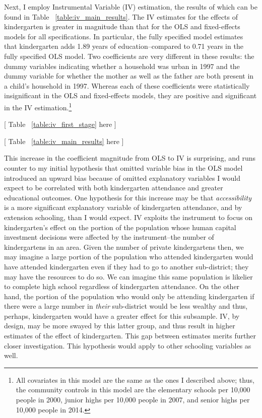 Next, I employ Instrumental Variable (IV) estimation, the results of which can be found in Table ~\ref{table:iv_main_results}. The IV estimates for the effects of kindergarten is greater in magnitude than that for the OLS and fixed-effects models for all specifications. In particular, the fully specified model estimates that kindergarten adds 1.89 years of education--compared to 0.71 years in the fully specified OLS model. Two coefficients are very different in these results: the dummy variables indicating whether a household was urban in 1997 and the dummy variable for whether the mother as well as the father are both present in a child’s household in 1997. Whereas each of these coefficients were statistically insignificant in the OLS and fixed-effects models, they are positive and significant in the IV estimation.\footnote{All covariates in this model are the same as the ones I described above; thus, the community controls in this model are the elementary schools per 10,000 people in 2000, junior highs per 10,000 people in 2007, and senior highs per 10,000 people in 2014.} 
\begin{center}
	[ Table ~\ref{table:iv_first_stage} here ]
	
	[ Table ~\ref{table:iv_main_results} here ]
\end{center}
This increase in the coefficient magnitude from OLS to IV is surprising, and runs counter to my initial hypothesis that omitted variable bias in the OLS model introduced an upward bias because of omitted explanatory variables I would expect to be correlated with both kindergarten attendance and greater educational outcomes. One hypothesis for this increase may be that \textit{accessibility} is a more significant explanatory variable of kindergarten attendance, and by extension schooling, than I would expect. IV exploits the instrument to focus on kindergarten's effect on the portion of the population whose human capital investment decisions were affected by the instrument--the number of kindergartens in an area. Given the number of private kindergartens then, we may imagine a large portion of the population who attended kindergarten would have attended kindergarten even if they had to go to another sub-district; they may have the resources to do so. We can imagine this same population is likelier to complete high school regardless of kindergarten attendance. On the other hand, the portion of the population who would only be attending kindergarten if there were a large number in \textit{their} sub-district would be less wealthy and thus, perhaps, kindergarten would have a greater effect for this subsample. IV, by design, may be more swayed by this latter group, and thus result in higher estimates of the effect of kindergarten. This gap between estimates merits further closer investigation. This hypothesis would apply to other schooling variables as well.


